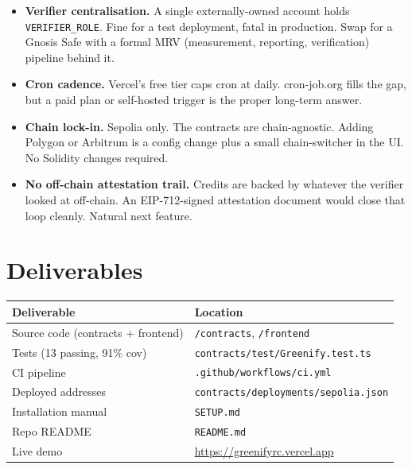 \documentclass[11pt,a4paper]{article}
\begin{document}
\begin{itemize}[leftmargin=1.3em, itemsep=2pt]
    \item \textbf{Verifier centralisation.} A single externally-owned
    account holds \texttt{VERIFIER\_ROLE}. Fine for a test deployment,
    fatal in production. Swap for a Gnosis Safe with a formal MRV
    (measurement, reporting, verification) pipeline behind it.
    \item \textbf{Cron cadence.} Vercel's free tier caps cron at daily.
    cron-job.org fills the gap, but a paid plan or self-hosted trigger
    is the proper long-term answer.
    \item \textbf{Chain lock-in.} Sepolia only. The contracts are
    chain-agnostic. Adding Polygon or Arbitrum is a config change plus a
    small chain-switcher in the UI. No Solidity changes required.
    \item \textbf{No off-chain attestation trail.} Credits are backed by
    whatever the verifier looked at off-chain. An EIP-712-signed
    attestation document would close that loop cleanly. Natural next
    feature.
\end{itemize}

\section{Deliverables}

\begin{table}[H]
\centering
\small
\begin{tabularx}{\linewidth}{lX}
\toprule
\textbf{Deliverable} & \textbf{Location} \\
\midrule
Source code (contracts + frontend) & \texttt{/contracts}, \texttt{/frontend} \\
Tests (13 passing, 91\% cov)        & \texttt{contracts/test/Greenify.test.ts} \\
CI pipeline                         & \texttt{.github/workflows/ci.yml} \\
Deployed addresses                  & \texttt{contracts/deployments/sepolia.json} \\
Installation manual                 & \texttt{SETUP.md} \\
Repo README                         & \texttt{README.md} \\
Live demo                           & \url{https://greenifyrc.vercel.app} \\
\bottomrule
\end{tabularx}
\end{table}
\end{document}
